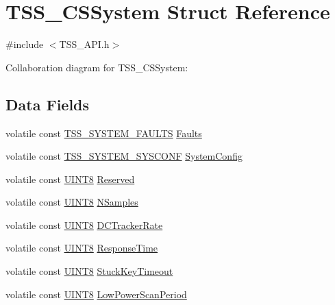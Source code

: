 \hypertarget{struct_t_s_s___c_s_system}{}\section{T\+S\+S\+\_\+\+C\+S\+System Struct Reference}
\label{struct_t_s_s___c_s_system}


{\ttfamily \#include $<$T\+S\+S\+\_\+\+A\+P\+I.\+h$>$}



Collaboration diagram for T\+S\+S\+\_\+\+C\+S\+System\+:
\subsection*{Data Fields}
\begin{DoxyCompactItemize}
\item 
volatile const \hyperlink{struct_t_s_s___s_y_s_t_e_m___f_a_u_l_t_s}{T\+S\+S\+\_\+\+S\+Y\+S\+T\+E\+M\+\_\+\+F\+A\+U\+L\+TS} \hyperlink{struct_t_s_s___c_s_system_a2e81acca5055e9b3a171f5f2c5240deb}{Faults}
\item 
volatile const \hyperlink{struct_t_s_s___s_y_s_t_e_m___s_y_s_c_o_n_f}{T\+S\+S\+\_\+\+S\+Y\+S\+T\+E\+M\+\_\+\+S\+Y\+S\+C\+O\+NF} \hyperlink{struct_t_s_s___c_s_system_a9e44eb4e9e8fc3831e2562fb5e3abf9d}{System\+Config}
\item 
volatile const \hyperlink{_t_s_s___data_types_8h_ab27e9918b538ce9d8ca692479b375b6a}{U\+I\+N\+T8} \hyperlink{struct_t_s_s___c_s_system_a0926327c6a81d40934d48e559535abed}{Reserved}
\item 
volatile const \hyperlink{_t_s_s___data_types_8h_ab27e9918b538ce9d8ca692479b375b6a}{U\+I\+N\+T8} \hyperlink{struct_t_s_s___c_s_system_acfb174152efd9e5ae35aea0937c9f2dd}{N\+Samples}
\item 
volatile const \hyperlink{_t_s_s___data_types_8h_ab27e9918b538ce9d8ca692479b375b6a}{U\+I\+N\+T8} \hyperlink{struct_t_s_s___c_s_system_a86480382c5122af4b7208f002c5b003e}{D\+C\+Tracker\+Rate}
\item 
volatile const \hyperlink{_t_s_s___data_types_8h_ab27e9918b538ce9d8ca692479b375b6a}{U\+I\+N\+T8} \hyperlink{struct_t_s_s___c_s_system_a7ee16cad8498fede346638ca0e0ac7d4}{Response\+Time}
\item 
volatile const \hyperlink{_t_s_s___data_types_8h_ab27e9918b538ce9d8ca692479b375b6a}{U\+I\+N\+T8} \hyperlink{struct_t_s_s___c_s_system_aae8437dc11d4aa34b03876fda4a086f7}{Stuck\+Key\+Timeout}
\item 
volatile const \hyperlink{_t_s_s___data_types_8h_ab27e9918b538ce9d8ca692479b375b6a}{U\+I\+N\+T8} \hyperlink{struct_t_s_s___c_s_system_ae8454824981da6defcf6cad81de26827}{Low\+Power\+Scan\+Period}

\end{DoxyCompactItemize}
